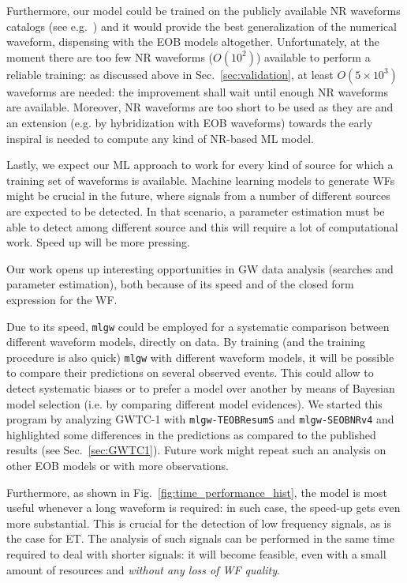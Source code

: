 Furthermore, our model could be trained on the publicly available NR waveforms 
catalogs (see e.g.~\cite{Mroue:2013xna,Boyle:2019kee,Healy:2019jyf}) and it would provide the best generalization of 
the numerical waveform, dispensing with the EOB models altogether.
Unfortunately, at the moment there are too few NR waveforms ($O(10^2)$) available to perform a reliable 
training: as discussed above in Sec.~\ref{sec:validation}, at least $O(5\times 10^3)$ waveforms are needed:
the improvement shall wait until enough NR waveforms are available.
Moreover, NR waveforms are too short to be used as they are and an extension (e.g. by hybridization with EOB waveforms)
towards the early inspiral is needed to compute any kind of NR-based ML model.

Lastly, we expect our ML approach to work for every kind of source for which a training set of 
waveforms is available. Machine learning models to generate WFs might be crucial in 
the future, where signals from a number of different sources are expected to be detected. In that scenario, 
a parameter estimation must be able to detect among different source and this will require a lot 
of computational work. Speed up will be more pressing.


Our work opens up interesting opportunities in GW data analysis (searches and parameter estimation), 
both because of its speed and of the closed form expression for the WF.

Due to its speed, \texttt{mlgw} could be employed for a systematic comparison between different waveform models, directly on data.
By training (and the training procedure is also quick) \texttt{mlgw} with different waveform models, it will be possible to compare their predictions on several observed events. This could allow to detect systematic biases or to prefer a model over another by means of Bayesian model selection (i.e. by comparing different model evidences).
We started this program by analyzing GWTC-1 with \texttt{mlgw-TEOBResumS} and \texttt{mlgw-SEOBNRv4} and 
highlighted some differences in the predictions as compared to the published results (see Sec.~\ref{sec:GWTC1}). 
Future work might repeat such an analysis on other EOB models or with more observations.

Furthermore, as shown in Fig.~\ref{fig:time_performance_hist}, the model is most useful whenever a long 
waveform is required: in such case, the speed-up gets even more substantial. This is crucial for the detection 
of low frequency signals, as is the case for ET. The analysis of such signals can be performed in the same time 
required to deal with shorter signals: it will become feasible, even with a small amount of resources and 
\textit{without any loss of WF quality}.

